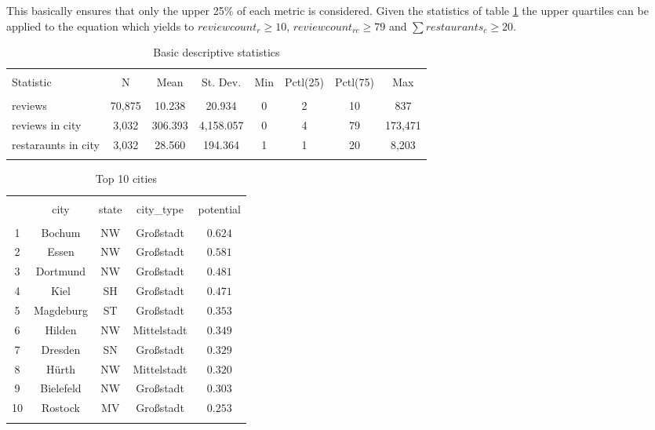 This basically ensures that only the upper 25\% of each metric is considered.
Given the statistics of table \ref{tab:stats} the upper quartiles can be applied to the equation which yields to $reviewcount_{r} \geq 10 $, $reviewcount_{rc} \geq 79$ and $\sum restaurants_{c} \geq 20$.
\begin{table}[!htbp] \centering
	\caption{Basic descriptive statistics}
	\label{tab:stats}
	\begin{tabular}{@{\extracolsep{5pt}}lccccccc}
		\\[-1.8ex]\hline
		\hline \\[-1.8ex]
		Statistic & \multicolumn{1}{c}{N} & \multicolumn{1}{c}{Mean} & \multicolumn{1}{c}{St. Dev.} & \multicolumn{1}{c}{Min} & \multicolumn{1}{c}{Pctl(25)} & \multicolumn{1}{c}{Pctl(75)} & \multicolumn{1}{c}{Max} \\
		\hline \\[-1.8ex]
		reviews & 70,875 & 10.238 & 20.934 & 0 & 2 & 10 & 837 \\
		reviews in city & 3,032 & 306.393 & 4,158.057 & 0 & 4 & 79 & 173,471 \\ 
		restaraunts in city & 3,032 & 28.560 & 194.364 & 1 & 1 & 20 & 8,203 \\ 
		\hline \\[-1.8ex]
	\end{tabular}
\end{table}
\begin{table}[!htbp] \centering 
	\caption{Top 10 cities} 
	\label{tab:top10cities} 
	\begin{tabular}{@{\extracolsep{5pt}} ccccc} 
		\\[-1.8ex]\hline 
		\hline \\[-1.8ex] 
		& city & state & city\_type & potential \\ 
		\hline \\[-1.8ex] 
		1 & Bochum & NW & Großstadt & $0.624$ \\ 
		2 & Essen & NW & Großstadt & $0.581$ \\ 
		3 & Dortmund & NW & Großstadt & $0.481$ \\ 
		4 & Kiel & SH & Großstadt & $0.471$ \\ 
		5 & Magdeburg & ST & Großstadt & $0.353$ \\ 
		6 & Hilden & NW & Mittelstadt & $0.349$ \\ 
		7 & Dresden & SN & Großstadt & $0.329$ \\ 
		8 & Hürth & NW & Mittelstadt & $0.320$ \\ 
		9 & Bielefeld & NW & Großstadt & $0.303$ \\ 
		10 & Rostock & MV & Großstadt & $0.253$ \\ 
		\hline \\[-1.8ex] 
	\end{tabular} 
\end{table}
